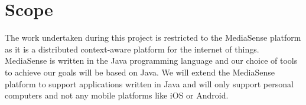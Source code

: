 \section{Scope}
The work undertaken during this project is restricted to the MediaSense platform as it is a distributed context-aware platform for the internet of things. MediaSense is written in the Java programming language and our choice of tools to achieve our goals will be based on Java. We will extend the MediaSense platform to support applications written in Java and will only support personal computers and not any mobile platforms like iOS or Android.
